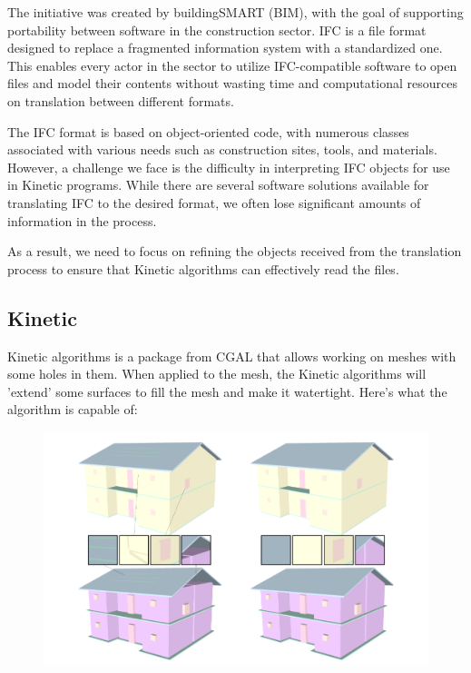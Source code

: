 \documentclass{article}
\begin{document}
The initiative was created by buildingSMART (BIM), with the goal of supporting portability between software in the construction sector.
 IFC is a file format designed to replace a fragmented information system with a standardized one.
  This enables every actor in the sector to utilize IFC-compatible software to open files and model their contents without wasting time and computational resources on translation between different formats.

The IFC format is based on object-oriented code, with numerous classes associated with various needs such as construction sites, tools, and materials.
However, a challenge we face is the difficulty in interpreting IFC objects for use in Kinetic programs. While there are several software solutions available for translating IFC to the desired format, 
we often lose significant amounts of information in the process.

As a result, we need to focus on refining the objects received from the translation process to ensure that Kinetic algorithms can effectively read the files.

\subsection{Kinetic}

Kinetic algorithms is a package from CGAL that allows working on meshes with 
some holes in them. When applied to the mesh, the Kinetic algorithms will 'extend' some surfaces to fill the mesh and make it watertight. 
Here's what the algorithm is capable of:


\begin{figure}[H]
    
\includegraphics[scale =   0.3 ]{../../images/example_algorithm.png}

\end{figure}
\end{document}

